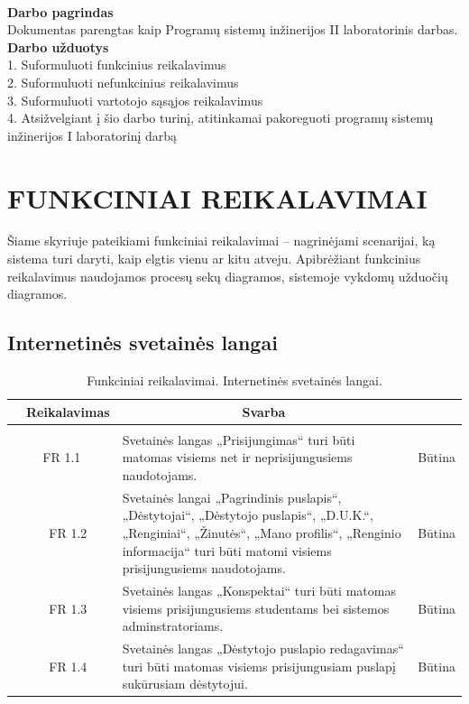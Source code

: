 \documentclass{VUMIFPSkursinis}
\begin{document}
\\\textbf{Darbo pagrindas}
\\Dokumentas parengtas kaip Programų sistemų inžinerijos II laboratorinis darbas.
\\\textbf{Darbo užduotys}
\\1. Suformuluoti funkcinius reikalavimus
\\2. Suformuluoti nefunkcinius reikalavimus
\\3. Suformuluoti vartotojo sąsąjos reikalavimus
\\4. Atsižvelgiant į šio darbo turinį, atitinkamai pakoreguoti programų sistemų inžinerijos I laboratorinį darbą 


\newpage

\section{FUNKCINIAI REIKALAVIMAI}
Šiame skyriuje pateikiami funkciniai reikalavimai – nagrinėjami scenarijai, ką sistema turi daryti, kaip elgtis vienu ar kitu atveju. Apibrėžiant funkcinius reikalavimus naudojamos procesų sekų diagramos, sistemoje vykdomų užduočių diagramos.
\subsection{Internetinės svetainės langai}
	\begin{table}[H]
	\caption{Funkciniai reikalavimai. Internetinės svetainės langai.}
	\begin{tabular}{|p{1cm}|p{1cm}|p{}|p{}|}
		\hline 
		\rowcolor{gray!50}
		\multicolumn{2}{|c|}{{\bfseries Kodas}}&
		\multicolumn{1}{c|}{{\bfseries Reikalavimas}}&
		\multicolumn{1}{c|}{{\bfseries Svarba}}\\
		\hline
		\rowcolor{lightgray}
		\multicolumn{4}{|c|}{Internetinės svetainės langai}\\		
		
		\hline
		\multicolumn{2}{|c|}{FR 1.1}&
		{Svetainės langas „Prisijungimas“ turi būti matomas visiems net ir neprisijungusiems naudotojams.
		}&		
		\multicolumn{1}{c|}{Būtina}\\
		\hline
		\multicolumn{1}{|c}{}&
		\multicolumn{1}{c|}{FR 1.2}&
		{Svetainės langai „Pagrindinis puslapis“, „Dėstytojai“, „Dėstytojo puslapis“, „D.U.K.“, „Renginiai“, „Žinutės“, „Mano profilis“, „Renginio informacija“ turi būti matomi visiems prisijungusiems naudotojams.
		}&		
		\multicolumn{1}{c|}{Būtina}\\
		\hline
		\multicolumn{1}{|c}{}&
		\multicolumn{1}{c|}{FR 1.3}&
		{Svetainės langas „Konspektai“ turi būti matomas visiems prisijungusiems studentams bei sistemos adminstratoriams.
		}&
		\multicolumn{1}{c|}{Būtina}\\	
		\hline		
		\multicolumn{1}{|c}{}&
		\multicolumn{1}{c|}{FR 1.4}&
		{Svetainės langas „Dėstytojo puslapio redagavimas“ turi būti matomas visiems prisijungusiam puslapį sukūrusiam dėstytojui.
		}&
		\multicolumn{1}{c|}{Būtina}\\									
		\hline
	\end{tabular}		
\end{table}
\end{document}
